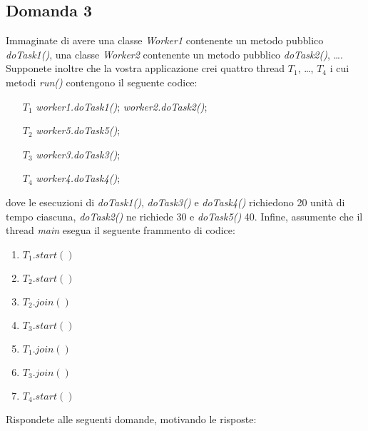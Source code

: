 \subsection{Domanda 3}
Immaginate di avere una classe \textit{Worker1} contenente un metodo pubblico \textit{doTask1()}, una classe \textit{Worker2} contenente un metodo pubblico \textit{doTask2()}, \ldots . Supponete inoltre che la vostra applicazione crei quattro thread $T_1$, \ldots, $T_4$ i cui metodi \textit{run()} contengono il seguente codice:
\begin{itemize}
	\item[$T_1$] \textit{worker1.doTask1()}; \textit{worker2.doTask2()};
	\item[$T_2$] \textit{worker5.doTask5()};
	\item[$T_3$] \textit{worker3.doTask3()};
	\item[$T_4$] \textit{worker4.doTask4()};
\end{itemize}
dove le esecuzioni di \textit{doTask1()}, \textit{doTask3()} e \textit{doTask4()} richiedono 20 unit\`{a} di tempo ciascuna, \textit{doTask2()} ne richiede 30 e \textit{doTask5()} 40. Infine, assumente che il thread \textit{main} esegua il seguente frammento di codice:
\begin{enumerate}
	\item $T_1.start()$
	\item $T_2.start()$
	\item $T_2.join()$
	\item $T_3.start()$
	\item $T_1.join()$
	\item $T_3.join()$
	\item $T_4.start()$
\end{enumerate}
Rispondete alle seguenti domande, motivando le risposte:
